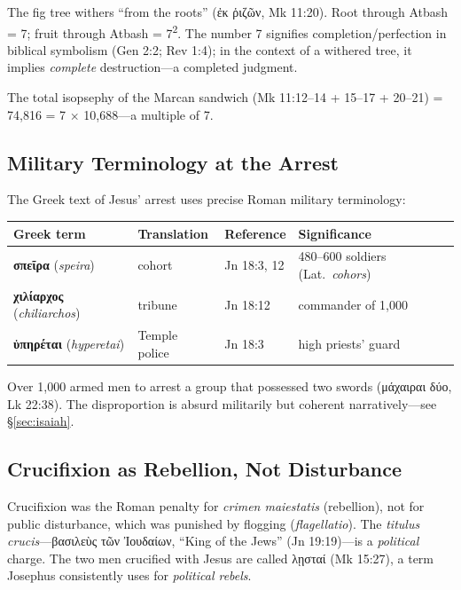 \documentclass[12pt,a4paper]{article}
\begin{document}
The fig tree withers ``from the roots'' (ἐκ ῥιζῶν, Mk 11:20). Root through Atbash = 7; fruit through Atbash = 7\textsuperscript{2}. The number 7 signifies completion/perfection in biblical symbolism (Gen 2:2; Rev 1:4); in the context of a withered tree, it implies \textit{complete} destruction---a completed judgment.

The total isopsephy of the Marcan sandwich (Mk 11:12--14 + 15--17 + 20--21) = 74,816 = 7 $\times$ 10,688---a multiple of 7.

\subsection{Military Terminology at the Arrest}

The Greek text of Jesus' arrest uses precise Roman military terminology:

\begin{center}
\small
\begin{tabular}{llll}
\toprule
\textbf{Greek term} & \textbf{Translation} & \textbf{Reference} & \textbf{Significance} \\
\midrule
\textbf{σπεῖρα} (\textit{speira}) & cohort & Jn 18:3, 12 & 480--600 soldiers (Lat.\ \textit{cohors}) \\
\textbf{χιλίαρχος} (\textit{chiliarchos}) & tribune & Jn 18:12 & commander of 1,000 \\
\textbf{ὑπηρέται} (\textit{hyperetai}) & Temple police & Jn 18:3 & high priests' guard \\
\bottomrule
\end{tabular}
\end{center}

Over 1,000 armed men to arrest a group that possessed two swords (μάχαιραι δύο, Lk 22:38). The disproportion is absurd militarily but coherent narratively---see \S\ref{sec:isaiah}.

\subsection{Crucifixion as Rebellion, Not Disturbance}

Crucifixion was the Roman penalty for \textit{crimen maiestatis} (rebellion), not for public disturbance, which was punished by flogging (\textit{flagellatio}). The \textit{titulus crucis}---βασιλεὺς τῶν Ἰουδαίων, ``King of the Jews'' (Jn 19:19)---is a \textit{political} charge. The two men crucified with Jesus are called λῃσταί (Mk 15:27), a term Josephus consistently uses for \textit{political rebels}.
\end{document}
